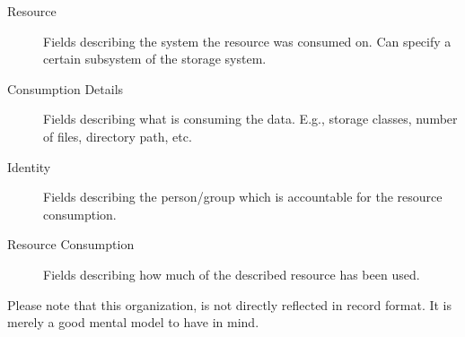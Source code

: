 \begin{description}

\item[Resource] Fields describing the system the resource was consumed on. Can
specify a certain subsystem of the storage system.

\item[Consumption Details] Fields describing what is consuming the data. E.g.,
storage classes, number of files, directory path, etc.

\item[Identity] Fields describing the person/group which is accountable for the
resource consumption.

\item[Resource Consumption] Fields describing how much of the described
resource has been used.

\end{description}

Please note that this organization, is not directly reflected in record format.
It is merely a good mental model to have in mind.


